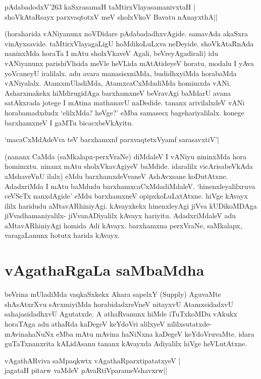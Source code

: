 \begin{shloka}
pAdabadodxV\char'263 kaSxrasamaH taMtirxVlayasamanivxtaH |\label{20b}\\
shoVkAtaRsayx parxvaqtotxV meV sholxVkoV Bavatu nAnayxthA||
\end{shloka}

(horaharida vANiyanunx noVDidare pAdabadadhxvAgide. samavAda akaSxra vinAyxsavide. taMtirxVlayagaLigU hoMdikoLuLxva neDeyide. shoVkAtaRnAda naninxMda horaTa I mAtu sholxVkaveV Agali, beVreyAgadirali) idu vANiyanunx  parishiVlisida meVle heVLida mAtAtideyeV horatu, modalu I yAva yoVcaneyU iralilalx. adu avara manasisxniMda, budidhxyiMda horabaMda vANiyalalx. AtamxmUladiMda, AtamxcaCxMdadiMda homimxda vANi. Asharxmakekx hiMdirugidAga barxhamxneV beVravAgi baMdarU avana satAkxrada jotege I mAtina mathanavU naDedide. tananx arivilalxdeV vANi horabamadxdudx `elilxMda? heVge?' eMba samasesx bagehariyalilalx. konege barxhamxneV I gaMTu bicacxbeVkAyitu.
\begin{shloka}
`macaCxMdAdeVva teV barxhamxnf parxvaqtetxVyamf sarasavxtiV'|\label{21a}
\end{shloka}

(nananx CaMda (saMkalapx-perxVraNe) diMdaleV I vANiyu nininxMda hora homimxtu. ninanx mAtu sholxVkavAgiyeV baMdide. idaralilx vicArisabeVkAda aMshaveVnU ilalx) eMdu barxhamxdeVvaneV AshAvxsane koDutAtxne. AdadxriMda I mAtu baMdudu barxhamxcaCxMdadiMdaleV. `hinenxleyalilxruva ceVSeTx  nanxdAgide' eMdu barxhamxneV opipxkoLuLxtAtxne. hiVge kAvayx ililx haridudu aMtavARhiniyAgi. kAvayxkekx hinenxleyAgi jiVva kUDikoMDAga jiVvadhamaniyalilx- jiVvanADiyalilx kAvayx hariyitu. AdadxriMdaleV adu aMtavARhiniyAgi homida Adi kAvayx. barxhamxna perxVraNe, saMkalapx, varagaLanunx hotutx harida kAvayx. 

\section*{vAgathaRgaLa saMbaMdha}

beVrina mUladiMda vaqkaSxkekx Ahara sapelxY {(\eng Supply)} AguvaMte shAsAtxrXvu sAvxmiyiMda horabidadxreVneV nitayxvU AtamxsidadxvU sahajasidadhxvU Agutatxde. A athaRvanunx hiMde iTuTxkoMDu vAkukx horaTAga adu athaRda kaDegeV keYdoVri alilxyeV nililxsutatxde-mAvinahaNuNx eMba mAtu mAvina haNiNxna kaDegeV keYdoVruvaMte. idara guTaTxnanxrita kALidAsanu tananx kAvayxda Adiyalilx hiVge heVLutAtxne.

\begin{shloka}
vAgathARviva saMpaqkwtx vAgathaRparxtipatatxyeV |\label{21b}\\
jagataH pitarw vaMdeV pAvaRtiVparameVshavxrw||
\end{shloka}

